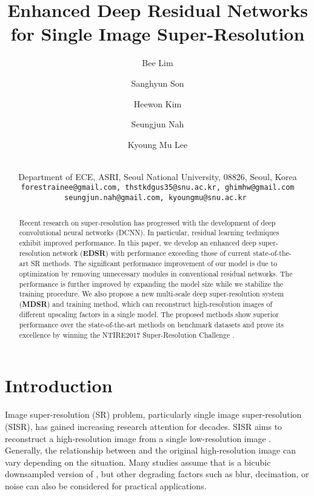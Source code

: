 \documentclass[10pt,twocolumn,letterpaper]{article}
\begin{document}
	\title{Enhanced Deep Residual Networks for Single Image Super-Resolution}
	
	\author{
		Bee Lim \and Sanghyun Son \and Heewon Kim \and Seungjun Nah \and Kyoung Mu Lee \and\\
		Department of ECE, ASRI, Seoul National University, 08826, Seoul, Korea\\
		\tt\small forestrainee@gmail.com, thstkdgus35@snu.ac.kr, ghimhw@gmail.com\\
		\tt\small seungjun.nah@gmail.com, kyoungmu@snu.ac.kr
	}
	
	\maketitle


	\begin{abstract}
		
		Recent research on super-resolution has progressed with the development of deep convolutional neural networks (DCNN). 
		In particular, residual learning techniques exhibit improved performance. 
		In this paper, we develop an enhanced deep super-resolution network (\textbf{EDSR}) with performance exceeding those of current state-of-the-art SR methods. 
		The significant performance improvement of our model is due to optimization by removing unnecessary modules in conventional residual networks. 
		The performance is further improved by expanding the model size while we stabilize the training procedure.
		We also propose a new multi-scale deep super-resolution system (\textbf{MDSR}) and training method, which can reconstruct high-resolution images of different upscaling factors in a single model. 
		The proposed methods show superior performance over the state-of-the-art methods on benchmark datasets and prove its excellence by winning the NTIRE2017 Super-Resolution Challenge \cite{Timofte_2017_CVPR_Workshops}. 

	\end{abstract}
	
	
	\section{Introduction}
	
	Image super-resolution (SR) problem, particularly single image super-resolution (SISR), has gained increasing research attention for decades.
	SISR aims to reconstruct a high-resolution image  from a single low-resolution image . 
	Generally, the relationship between  and the original high-resolution image  can vary depending on the situation. 
	Many studies assume that  is a bicubic downsampled version of , but other degrading factors such as blur, decimation, or noise can also be considered for practical applications.
	
\end{document}
